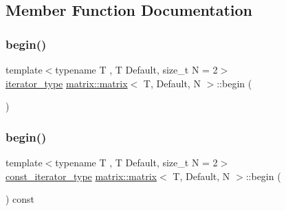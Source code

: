 \subsection{Member Function Documentation}
\mbox{\label{structmatrix_1_1matrix_a1409af506e9c9fd589cf5d3f586fad4d}} 
\subsubsection{\texorpdfstring{begin()}{begin()}\hspace{0.1cm}{\footnotesize\ttfamily [1/2]}}
{\footnotesize\ttfamily template$<$typename T , T Default, size\+\_\+t N = 2$>$ \\
\hyperlink{structmatrix_1_1matrix_a82eef2feb50cdf62ced121fb74d3bc67}{iterator\+\_\+type} \hyperlink{structmatrix_1_1matrix}{matrix\+::matrix}$<$ T, Default, N $>$\+::begin (\begin{DoxyParamCaption}{ }\end{DoxyParamCaption})\hspace{0.3cm}{\ttfamily [inline]}}

\mbox{\label{structmatrix_1_1matrix_a864ff04f4b3590b5411746ab576c53e1}} 
\subsubsection{\texorpdfstring{begin()}{begin()}\hspace{0.1cm}{\footnotesize\ttfamily [2/2]}}
{\footnotesize\ttfamily template$<$typename T , T Default, size\+\_\+t N = 2$>$ \\
\hyperlink{structmatrix_1_1matrix_a22035dd29cc89014fbb33fd37bfeac93}{const\+\_\+iterator\+\_\+type} \hyperlink{structmatrix_1_1matrix}{matrix\+::matrix}$<$ T, Default, N $>$\+::begin (\begin{DoxyParamCaption}{ }\end{DoxyParamCaption}) const\hspace{0.3cm}{\ttfamily [inline]}}

\mbox{\label{structmatrix_1_1matrix_a8a19b8753df3bc95f0955e85be430bb5}} 
